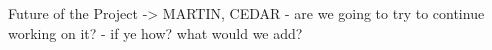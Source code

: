 Future of the Project -> MARTIN, CEDAR
  - are we going to try to continue working on it?
  - if ye how? what would we add?
